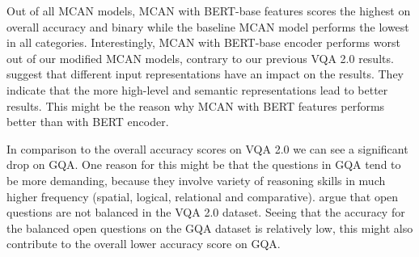 \documentclass{article}
\begin{document}
Out of all MCAN models, MCAN with BERT-base features scores the highest on overall accuracy and binary while the baseline MCAN model performs the lowest in all categories. %
Interestingly, MCAN with BERT-base encoder performs worst out of our modified MCAN models, contrary to our previous VQA 2.0 results. \cite{hudson2019gqa} suggest that different input representations have an impact on the results. They indicate that the more high-level and semantic representations lead to better results. This might be the reason why MCAN with BERT features performs better than with BERT encoder.

In comparison to the overall accuracy scores on VQA 2.0 we can see a significant drop on GQA. One reason for this might be that the questions in GQA tend to be more demanding, because they involve variety of reasoning skills in much higher frequency (spatial, logical, relational and comparative). \cite{hudson2019gqa} argue that open questions are not balanced in the VQA 2.0 dataset. Seeing that the accuracy for the balanced open questions on the GQA dataset is relatively low, this might also contribute to the overall lower accuracy score on GQA.



\end{document}
